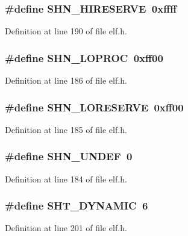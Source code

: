 \subsubsection[{SHN\_\-HIRESERVE}]{\setlength{\rightskip}{0pt plus 5cm}\#define SHN\_\-HIRESERVE~0xffff}\label{elf_8h_aac4804ef07b9da1d840d951469692f0}




Definition at line 190 of file elf.h.
\subsubsection[{SHN\_\-LOPROC}]{\setlength{\rightskip}{0pt plus 5cm}\#define SHN\_\-LOPROC~0xff00}\label{elf_8h_b9efa7bd7617e554f6158699401d4e10}




Definition at line 186 of file elf.h.
\subsubsection[{SHN\_\-LORESERVE}]{\setlength{\rightskip}{0pt plus 5cm}\#define SHN\_\-LORESERVE~0xff00}\label{elf_8h_c663b490fedc8aeab91bf941772ba306}




Definition at line 185 of file elf.h.
\subsubsection[{SHN\_\-UNDEF}]{\setlength{\rightskip}{0pt plus 5cm}\#define SHN\_\-UNDEF~0}\label{elf_8h_b2f25695673c5f1c4ec723e595288411}




Definition at line 184 of file elf.h.
\subsubsection[{SHT\_\-DYNAMIC}]{\setlength{\rightskip}{0pt plus 5cm}\#define SHT\_\-DYNAMIC~6}\label{elf_8h_3a9278d12cf2c9e7eaca87688d0a6e37}




Definition at line 201 of file elf.h.
